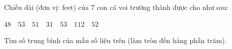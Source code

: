 \begin{ex}
Chiều dài (đơn vị: feet) của $7$ con cá voi trưởng thành được cho như sau:
\begin{center}
$48 \quad 53 \quad 51 \quad 31 \quad 53 \quad 112 \quad 52$
\end{center}
Tìm số trung bình của mẫu số liệu trên (làm tròn đến hàng phần trăm).
\end{ex}
